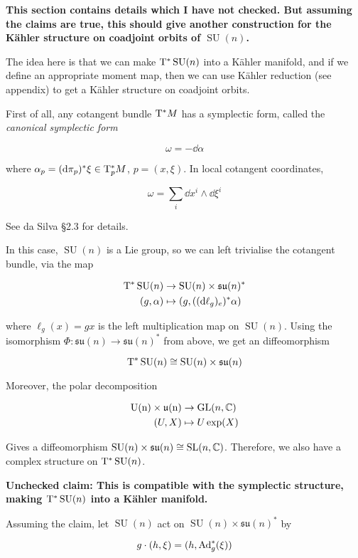 \documentclass{article}
\DeclareMathOperator{\SU}{SU}
\newcommand{\su}{\mathfrak{su}}
\begin{document}
\textbf{This section contains details which I have not checked. But assuming the claims are true, this should give another construction for the K\"ahler structure on coadjoint orbits of \(\SU(n)\).}

The idea here is that we can make \(\T^*\SU(n)\) into a K\"ahler manifold, and if we define an appropriate moment map, then we can use K\"ahler reduction (see appendix) to get a K\"ahler structure on coadjoint orbits.

First of all, any cotangent bundle \(\mathrm{T}^*M\) has a symplectic form, called the \emph{canonical symplectic form}

\[\omega = -\dd\alpha\]

where \(\alpha_p = (\dd\pi_p)^*\xi \in \mathrm{T}_p^*M\), \(p = (x, \xi)\). In local cotangent coordinates,

\[\omega = \sum_i \dd x^i \wedge \dd \xi^i\]

See da Silva \S 2.3 for details.

In this case, \(\SU(n)\) is a Lie group, so we can left trivialise the cotangent bundle, via the map

\begin{align*}
    \TT^*\SU(n) &\to \SU(n) \times \su(n)^* \\
    (g, \alpha) &\mapsto (g, ((\dd\ell_g)_e)^*\alpha) 
\end{align*}

where \(\ell_g(x) = gx\) is the left multiplication map on \(\SU(n)\). Using the isomorphism \(\Phi : \su(n) \to \su(n)^*\) from above, we get an diffeomorphism

\[\T^* \SU(n) \cong \SU(n)\times \su(n)\]

Moreover, the polar decomposition

\begin{align*}
    \rm U(n) \times \mathfrak{u}(n) &\to \operatorname{GL}(n, \mathbb{C}) \\
    (U, X) &\mapsto U \exp(X)
\end{align*}

Gives a diffeomorphism \(\SU(n) \times \su(n) \cong \SL(n, \C)\). Therefore, we also have a complex structure on \(\T^*\SU(n)\). 

\textbf{Unchecked claim: This is compatible with the symplectic structure, making \(\T^*\SU(n)\) into a K\"ahler manifold.}

Assuming the claim, let \(\SU(n)\) act on \(\SU(n) \times \su(n)^*\) by

\[g \cdot (h, \xi) = (h, \operatorname{Ad}_g^*(\xi))\]
\end{document}
